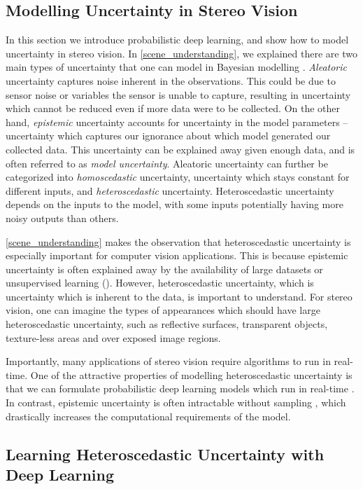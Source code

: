 \subsection{Modelling Uncertainty in Stereo Vision}
\label{sec:unc_model}

In this section we introduce probabilistic deep learning, and show how to model uncertainty in stereo vision. In \cref{scene_understanding}, we explained there are two main types of uncertainty that one can model in Bayesian modelling \citep{der2009aleatory}. \textit{Aleatoric} uncertainty captures noise inherent in the observations. This could be due to sensor noise or variables the sensor is unable to capture, resulting in uncertainty which cannot be reduced even if more data were to be collected.
On the other hand, \textit{epistemic} uncertainty accounts for uncertainty in the model parameters -- uncertainty which captures our ignorance about which model generated our collected data.
This uncertainty can be explained away given enough data, and is often referred to as \textit{model uncertainty}. Aleatoric uncertainty can further be categorized into \textit{homoscedastic} uncertainty, uncertainty which stays constant for different inputs, and \textit{heteroscedastic} uncertainty. Heteroscedastic uncertainty depends on the inputs to the model, with some inputs potentially having more noisy outputs than others. 

\cref{scene_understanding} makes the observation that heteroscedastic uncertainty is especially important for computer vision applications. This is because epistemic uncertainty is often explained away by the availability of large datasets or unsupervised learning (). However, heteroscedastic uncertainty, which is uncertainty which is inherent to the data, is important to understand. For stereo vision, one can imagine the types of appearances which should have large heteroscedastic uncertainty, such as reflective surfaces, transparent objects, texture-less areas and over exposed image regions.

Importantly, many applications of stereo vision require algorithms to run in real-time. One of the attractive properties of modelling heteroscedastic uncertainty is that we can formulate probabilistic deep learning models which run in real-time \citep{kendall2017uncertainties}. In contrast, epistemic uncertainty is often intractable without sampling \citep{gal2016thesis}, which drastically increases the computational requirements of the model.

\subsection{Learning Heteroscedastic Uncertainty with Deep Learning}
\label{sec:bayes_loss}

